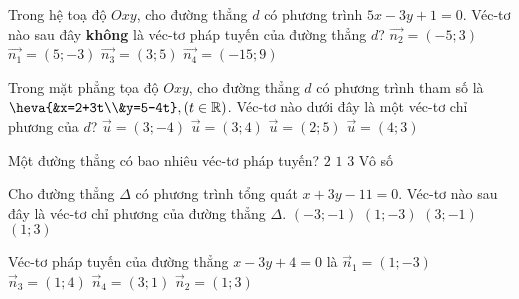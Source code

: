 \begin{ex}%
	Trong hệ toạ độ $Oxy$, cho đường thẳng $d$ có phương trình $5x-3y+1=0$. Véc-tơ nào sau đây \textbf{không} là véc-tơ pháp tuyến của đường thẳng $d$?
	\choice
	{$\overrightarrow{n_2}=(-5;3)$}
	{$\overrightarrow{n_1}=(5;-3)$}
	{\True $\overrightarrow{n_3}=(3;5)$}
	{$\overrightarrow{n_4}=(-15;9)$}
\end{ex}


\begin{ex}%
	Trong mặt phẳng tọa độ $Oxy$, cho đường thẳng $d$ có phương trình tham số là $\heva{&x=2+3t\\&y=5-4t},(t\in\mathbb{R})$. Véc-tơ nào dưới đây là một véc-tơ chỉ phương của $d$?
	\choice
	{\True $\overrightarrow{u}=(3;-4)$}
	{$\overrightarrow{u}=(3;4)$}
	{$\overrightarrow{u}=(2;5)$}
	{$\overrightarrow{u}=(4;3)$}
\end{ex}


\begin{ex}%
	Một đường thẳng có bao nhiêu véc-tơ pháp tuyến?
	\choice
	{$ 2 $}
	{$ 1 $}
	{$ 3 $}
	{\True Vô số}
\end{ex}


\begin{ex}%
	Cho đường thẳng $\Delta$ có phương trình tổng quát $x+3y-11=0$. Véc-tơ nào sau đây là véc-tơ chỉ phương của đường thẳng $\Delta$.
	\choice
	{$(-3;-1)$}
	{$(1;-3)$}
	{\True $(3;-1)$}
	{$(1;3)$}
\end{ex}


\begin{ex}%
	Véc-tơ pháp tuyến của đường thẳng $x-3y+4=0$ là
	\choice
	{\True $\overrightarrow{n}_1=\left(1;-3\right)$}
	{$\overrightarrow{n}_3=\left(1;4\right)$}
	{$\overrightarrow{n}_4=\left(3;1\right)$}
	{$\overrightarrow{n}_2=\left(1;3\right)$}
\end{ex}


